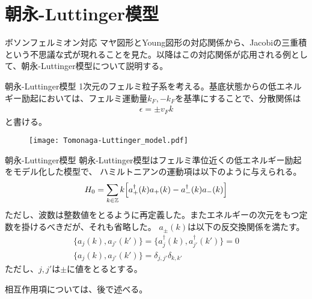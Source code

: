 \documentclass[\main/TL_liquid.tex]{subfiles}
\begin{document}
\section{朝永-Luttinger模型}
\begin{frame}{ボソンフェルミオン対応}
    マヤ図形とYoung図形の対応関係から、Jacobiの三重積という不思議な式が現れることを見た。以降はこの対応関係が応用される例として、朝永-Luttinger模型について説明する。
\end{frame}

\begin{frame}{朝永-Luttinger模型}
    1次元のフェルミ粒子系を考える。基底状態からの低エネルギー励起においては、フェルミ運動量$k_F, -k_F$を基準にすることで、分散関係は
    \begin{align}
        \epsilon = \pm v_F k
    \end{align}
    と書ける。
    \begin{figure}[H]
        \centering
        \texttt{[image: Tomonaga-Luttinger\_model.pdf]}
    \end{figure}
\end{frame}

\begin{frame}{朝永-Luttinger模型}
    朝永-Luttinger模型はフェルミ準位近くの低エネルギー励起をモデル化した模型で、
    ハミルトニアンの運動項は以下のように与えられる。
    \begin{align}
        H_0
        = \sum_{k \in \mathbb{Z}} k\qty[
            a_+^{\dagger}(k) a_+(k)
            - a_-^{\dagger}(k) a_-(k)
        ]
    \end{align}
    ただし、波数は整数値をとるように再定義した。またエネルギーの次元をもつ定数を掛けるべきだが、それも省略した。
    $a_{\pm}(k)$は以下の反交換関係を満たす。 
    \begin{gather}
        \{a_j(k),a_{j'}(k')\}
        = \{a_j^\dagger(k), a_{j'}^\dagger(k')\} = 0
        \\
        \{a_j(k),a_{j'}(k')\} = \delta_{j,j'}\delta_{k,k'}
    \end{gather}
    ただし、$j,j'$は$\pm$に値をとるとする。

    相互作用項については、後で述べる。
\end{frame}
\end{document}
